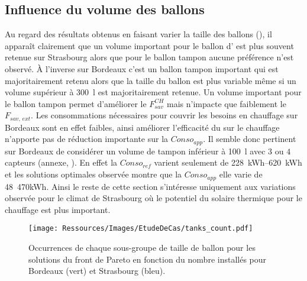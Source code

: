 \subsection{Influence du volume des ballons} %
\label{sub:influence_du_volume_des_ballons}
Au regard des résultats obtenus en faisant varier la taille des ballons
(), il apparaît clairement que un volume important
pour le ballon d’ est plus souvent retenue sur Strasbourg alors que pour le
ballon tampon aucune préférence n’est observé. À l’inverse sur Bordeaux c’est un ballon
tampon important qui est majoritairement retenu alors que la taille du ballon 
est plus variable même si un volume supérieur à \SI{300}{\litre} est majoritairement
retenue. Un volume important pour le ballon tampon permet d’améliorer le $F_{sav}^{CH}$
mais n’impacte que faiblement le $F_{sav,\, ext}$. Les consommations nécessaires pour
couvrir les besoins en chauffage sur Bordeaux sont en effet faibles, ainsi améliorer
l’efficacité du  sur le chauffage n’apporte pas de réduction importante sur la
$Conso_{app}$. Il semble donc pertinent sur Bordeaux de considérer un volume de tampon
inférieur à \SI{100}{\litre} avec $3$ ou $4$ capteurs (annexe, ).
En effet la $Conso_{ref}$ varient seulement de \SIrange{228}{620}{kWh} et les solutions
optimales observée montre que la $Conso_{app}$ elle varie de \SI{48}{470}{kWh}. Ainsi le
reste de cette section s’intéresse uniquement aux variations observée pour le climat de
Strasbourg où le potentiel du solaire thermique pour le chauffage est plus important.

\begin{figure}
    \centering
    \texttt{[image: Ressources/Images/EtudeDeCas/tanks\_count.pdf]}
    \caption[Occurrences de chaque sous-groupe de taille de ballon pour les solutions du front de Pareto]
             {Occurrences de chaque sous-groupe de taille de ballon pour les solutions du front de Pareto
              en fonction du nombre installés pour Bordeaux (vert) et Strasbourg (bleu).}
    \label{fig:occurence_taille_ballons}
\end{figure}

